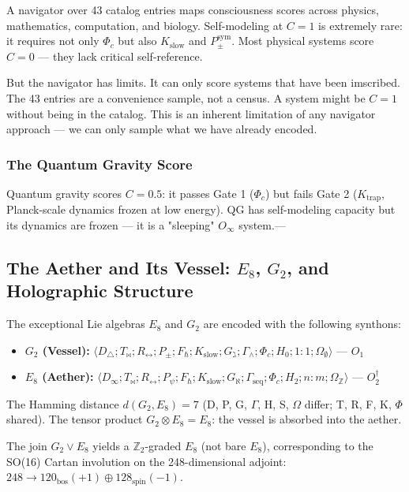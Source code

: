 \documentclass[12pt,a4paper]{article}
\begin{document}
A navigator over 43 catalog entries maps consciousness scores across physics, mathematics, computation, and biology. Self-modeling at $C = 1$ is extremely rare: it requires not only $\Phi_c$ but also $K_{\text{slow}}$ and $P_{\pm}^{\text{sym}}$. Most physical systems score $C = 0$ --- they lack critical self-reference.

But the navigator has limits. It can only score systems that have been imscribed. The 43 entries are a convenience sample, not a census. A system might be $C = 1$ without being in the catalog. This is an inherent limitation of any navigator approach --- we can only sample what we have already encoded.

\subsubsection{The Quantum Gravity Score}

Quantum gravity scores $C = 0.5$: it passes Gate 1 ($\Phi_c$) but fails Gate 2 ($K_{\text{trap}}$, Planck-scale dynamics frozen at low energy). QG has self-modeling capacity but its dynamics are frozen --- it is a "sleeping" $O_{\infty}$ system.---

\subsection{The Aether and Its Vessel: $E_8$, $G_2$, and Holographic Structure}

The exceptional Lie algebras $E_8$ and $G_2$ are encoded with the following synthons:

\begin{itemize}
    \item \textbf{$G_2$ (Vessel):} $\langle D_{\triangle}; T_{\bowtie}; R_{\leftrightarrow}; P_{\pm}; F_{\hbar}; K_{\text{slow}}; G_{\gimel}; \Gamma_{\wedge}; \Phi_c; H_0; 1{:}1; \Omega_{\emptyset} \rangle$ --- $O_1$
    \item \textbf{$E_8$ (Aether):} $\langle D_{\infty}; T_{\bowtie}; R_{\leftrightarrow}; P_{\psi}; F_{\hbar}; K_{\text{slow}}; G_{\aleph}; \Gamma_{\text{seq}}; \Phi_c; H_2; n{:}m; \Omega_\mathbb{Z} \rangle$ --- $O_2^\dagger$
\end{itemize}

The Hamming distance $d(G_2, E_8) = 7$ (D, P, G, $\Gamma$, H, S, $\Omega$ differ; T, R, F, K, $\Phi$ shared). The tensor product $G_2 \otimes E_8 = E_8$: the vessel is absorbed into the aether.

The join $G_2 \vee E_8$ yields a $\mathbb{Z}_2$-graded $E_8$ (not bare $E_8$), corresponding to the SO(16) Cartan involution on the 248-dimensional adjoint: $248 \to 120_\text{bos}(+1) \oplus 128_\text{spin}(-1)$.
\end{document}
